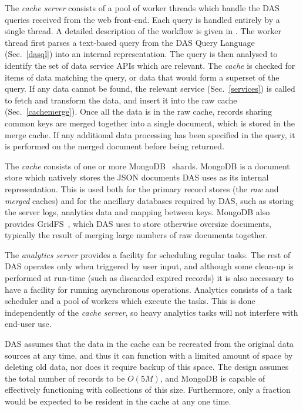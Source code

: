 \documentclass[a4paper]{jpconf}
\begin{document}
The \emph{cache server} consists of a pool of worker threads which handle the DAS queries received from the web front-end. Each query is handled entirely by a single thread. A detailed description of the workflow is given in \cite{das2010}. The worker thread first parses a text-based query from the DAS Query Language (Sec.~\ref{dasql}) into an internal representation. The query is then analysed to identify the set of data service APIs which are relevant. The \emph{cache} is checked for items of data matching the query, or data that would form a superset of the query. If any data cannot be found, the relevant service (Sec.~\ref{services}) is called to fetch and transform the data, and insert it into the raw cache (Sec.~\ref{cachemerge}). Once all the data is in the raw cache, records sharing common keys are merged together into a single document, which is stored in the merge cache. If any additional data processing has been specified in the query, it is performed on the merged document before being returned.

The \emph{cache} consists of one or more MongoDB~\cite{mongodb} shards. MongoDB is a document store which natively stores the JSON documents DAS uses as its internal representation. This is used both for the primary record stores (the \emph{raw} and \emph{merged} caches) and for the ancillary databases required by DAS, such as storing the server logs, analytics data and mapping between keys. MongoDB also provides GridFS~\cite{gridfs}, which DAS uses to store otherwise oversize documents, typically the result of merging large numbers of raw documents together.

The \emph{analytics server} provides a facility for scheduling regular tasks. The rest of DAS operates only when triggered by user input, and although some clean-up is performed at run-time (such as discarded expired records) it is also necessary to have a facility for running asynchronous operations. Analytics consists of a task scheduler and a pool of workers which execute the tasks. This is done independently of the \emph{cache server}, so heavy analytics tasks will not interfere with end-user use.

DAS assumes that the data in the cache can be recreated from the original data sources at any time, and thus it can function with a limited amount of space by deleting old data, nor does it require backup of this space. The design assumes the total number of records to be $O(5M)$, and MongoDB is capable of effectively functioning with collections of this size. Furthermore,  only a fraction would be expected to be resident in the cache at any one time.
\end{document}
